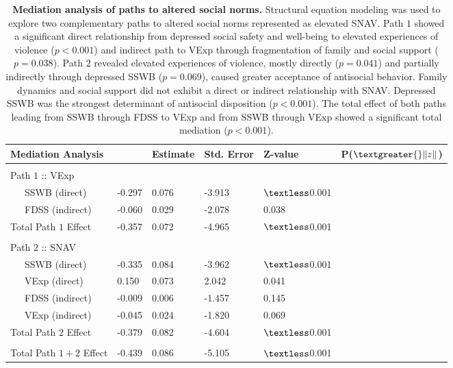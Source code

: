 \documentclass[utf8]{article}
\begin{document}
\begin{table}[h!]
\begin{tabular}{llllll}
Mediation Analysis &      & Estimate & Std. Error & Z-value & P($\textgreater{}\|z\|$) \\ \hline
                           &          &            &         &                          \\
Path $1$ :: VExp                       &          &            &         &                          \\
\ \ \ SSWB (direct) & -0.297   & 0.076      & -3.913  & $\textless$0.001                    \\
\ \ \ FDSS (indirect) & -0.060   & 0.029      & -2.078  & 0.038                    \\ \hline  Total Path $1$ Effect                    & -0.357   & 0.072      & -4.965  & $\textless$0.001                    \\
                           &          &            &         &                          \\
Path $2$ :: SNAV                       &          &            &         &                          \\
\ \ \ SSWB (direct) & -0.335   & 0.084      & -3.962  & $\textless$0.001                    \\
\ \ \ VExp (direct)  & 0.150    & 0.073      & 2.042   & 0.041                    \\
\ \ \ FDSS (indirect)  & -0.009   & 0.006      & -1.457  & 0.145                    \\
\ \ \ VExp (indirect) & -0.045   & 0.024      & -1.820  & 0.069                    \\ \hline
Total Path $2$ Effect                      & -0.379   & 0.082      & -4.604  & $\textless$0.001                    \\
                           &          &            &         &                          \\
Total Path $1+2$ Effect                     & -0.439   & 0.086      & -5.105  & $\textless$0.001                   
\end{tabular}
\caption{\textbf{Mediation analysis of paths to altered social norms.} Structural equation modeling was used to explore two complementary paths to altered social norms represented as elevated SNAV. Path $1$ showed a significant direct relationship from depressed social safety and well-being to elevated experiences of violence ($p<0.001$) and indirect path to VExp through fragmentation of family and social support ($p=0.038$). Path $2$ 	revealed elevated experiences of violence, mostly directly ($p=0.041$) and partially indirectly through depressed SSWB ($p=0.069$), caused greater acceptance of antisocial behavior. Family dynamics and social support did not exhibit a direct or indirect relationship with SNAV. Depressed SSWB was the strongest determinant of antisocial disposition ($p<0.001$). The total effect of both paths leading from SSWB through FDSS to VExp and from SSWB through VExp showed a significant total mediation ($p<0.001$). \label{tab:11}}
\end{table}
\end{document}

